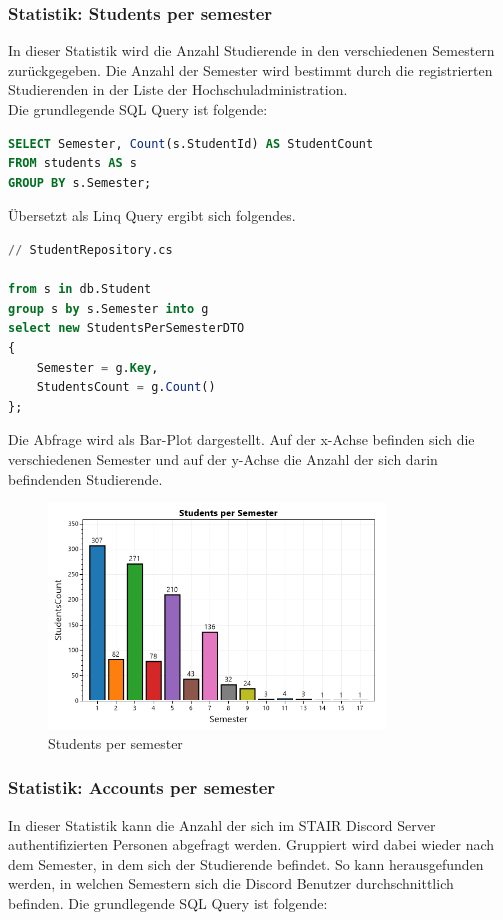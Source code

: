 \documentclass[a4paper, table]{article}
\begin{document}
\newpage
\subsubsection*{Statistik: Students per semester}
In dieser Statistik wird die Anzahl Studierende in den verschiedenen Semestern zurückgegeben. 
Die Anzahl der Semester wird bestimmt durch die registrierten Studierenden in der Liste der Hochschuladministration.\\
Die grundlegende SQL Query ist folgende:

\begin{lstlisting}[language=SQL]
SELECT Semester, Count(s.StudentId) AS StudentCount
FROM students AS s
GROUP BY s.Semester;
\end{lstlisting}

Übersetzt als Linq Query ergibt sich folgendes.

\begin{lstlisting}[language=SQL]
// StudentRepository.cs

from s in db.Student
group s by s.Semester into g
select new StudentsPerSemesterDTO
{
    Semester = g.Key,
    StudentsCount = g.Count()
};
\end{lstlisting}

Die Abfrage wird als Bar-Plot dargestellt. 
Auf der x-Achse befinden sich die verschiedenen Semester und auf der y-Achse die Anzahl der sich darin befindenden Studierende.

\begin{figure}[h]
    \centering
    \includegraphics[width=0.8\textwidth]{img/studentsPerSemester.png}
    \caption{Students per semester}
    \label{fig:students-per-semester}
\end{figure}

\newpage
\subsubsection*{Statistik: Accounts per semester}
In dieser Statistik kann die Anzahl der sich im STAIR Discord Server authentifizierten Personen abgefragt werden. 
Gruppiert wird dabei wieder nach dem Semester, in dem sich der Studierende befindet. 
So kann herausgefunden werden, in welchen Semestern sich die Discord Benutzer durchschnittlich befinden. 
Die grundlegende SQL Query ist folgende:
\end{document}
